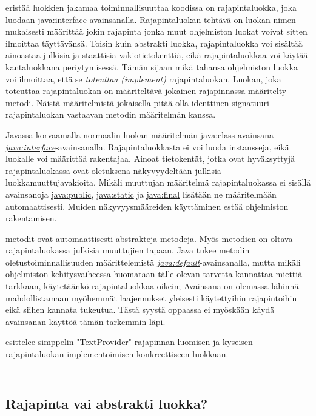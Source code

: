 \documentclass{tufte-book}
\newcommand{\eng}[1]{\textit{(#1)}}
\newcommand{\new}[1]{\textit{\gls{#1}}}
\newcommand{\neweng}[2]{\new{#1} \eng{#2}}
\newcommand{\java}[1]{\underline{\gls{java:#1}}}
\newcommand{\newjava}[1]{\textit{\java{#1}}}
\newcommand{\code}[3]{
\begin{listing}
    \inputminted{java}{OhjelmointiopasEsimerkit/src/#1/#2.java}
    \caption{#3}
    \label{Java-#1-#2}
\end{listing}
}
\begin{document}
 eristää luokkien jakamaa toiminnallisuuttaa koodissa on rajapintaluokka,
joka luodaan \java{interface}-avainsanalla. Rajapintaluokan tehtävä on luokan nimen mukaisesti
määrittää jokin \gls{rajapinta} jonka muut ohjelmiston luokat voivat sitten ilmoittaa täyttävänsä.
Toisin kuin \gls{abstrakti luokka}, rajapintaluokka voi sisältää ainoastaa julkisia ja staattisia 
vakiotietokenttiä, eikä rajapintaluokkaa voi käytää kantaluokkana periytymisessä. Tämän sijaan
mikä tahansa ohjelmiston luokka voi ilmoittaa, että se \neweng{toteuttaa}{implement}
rajapintaluokan. Luokan, joka toteuttaa rajapintaluokan on määriteltävä jokainen rajapinnassa
määritelty metodi. Näistä määritelmistä jokaisella pitää olla identtinen \gls{signatuuri}
rajapintaluokan vastaavan metodin määritelmän kanssa.

 Javassa korvaamalla normaalin luokan määritelmän 
\java{class}-avainsana \newjava{interface}-avainsanalla. Rajapintaluokkasta ei voi luoda
instansseja, eikä luokalle voi määrittää rakentajaa. Ainoat tietokentät, jotka ovat hyväksyttyjä
rajapintaluokassa ovat oletuksena näkyvyydeltään julkisia luokkamuuttujavakioita. Mikäli muuttujan
määritelmä rajapintaluokassa ei sisällä avainsanoja \java{public}, \java{static} ja \java{final}
lisätään ne määritelmään automaattisesti. Muiden näkyvyysmääreiden käyttäminen estää ohjelmiston
rakentamisen.

 metodit ovat automaattisesti abstrakteja metodeja. Myös
metodien on oltava rajapintaluokassa julkisia muuttujien tapaan. Java tukee metodin
oletustoiminnallisuuden määrittelemistä \newjava{default}-avainsanalla, mutta mikäli ohjelmiston
kehitysvaiheessa huomataan tälle olevan tarvetta kannattaa miettiä tarkkaan, käytetäänkö
rajapintaluokkaa oikein; Avainsana on olemassa lähinnä mahdollistamaan myöhemmät laajennukset
yleisesti käytettyihin rajapintoihin eikä siihen kannata tukeutua. Tästä syystä oppaassa ei
myöskään käydä avainsanan käyttöä tämän tarkemmin läpi.

 esittelee simppelin "TextProvider"-rajapinnan luomisen ja
kyseisen rajapintaluokan implementoimisen konkreettiseen luokkaan.

\code{week6/interfaceexample}{TextProvider}{TextProvider rajapintaluokka}
\code{week6/interfaceexample}{FunctionalClass}{Luokka, joka implementoi TextProvider-rajapinnan}

\subsection{Rajapinta vai abstrakti luokka?}
\label{interface v abstract}
\end{document}
